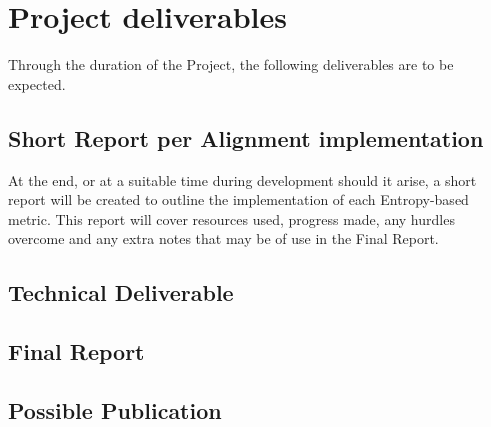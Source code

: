 \documentclass[11pt,fleqn,twoside]{article}
\begin{document}
\section{Project deliverables}
Through the duration of the Project, the following deliverables are to be expected.

\subsection{Short Report per Alignment implementation}
At the end, or at a suitable time during development should it arise, a short report will be created to outline the implementation of each Entropy-based metric. This report will cover resources used, progress made, any hurdles overcome and any extra notes that may be of use in the Final Report.

\subsection{Technical Deliverable}

\subsection{Final Report}

\subsection{Possible Publication}


\nocite{*} %

\newpage
{}

%
%

\renewcommand{\refname}{Annotated Bibliography}  %
\end{document}
